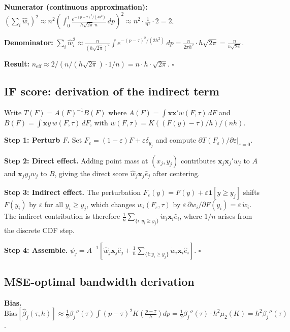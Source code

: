 \documentclass[12pt,a4paper]{article}
\theoremstyle{definition}
\newcommand{\bx}{\mathbf{x}}
\newcommand{\hw}{\hat{w}}
\begin{document}
\textbf{Numerator (continuous approximation):}
$(\sum_i\hw_i)^2 \approx n^2\left(\int_0^1
\frac{e^{-(p-\tau)^2/(4h^2)}}{h\sqrt{2\pi}\,n}\,dp\right)^2
\approx n^2 \cdot \frac{1}{n^2}\cdot 2 = 2$.

\textbf{Denominator:}
$\sum_i\hw_i^2 \approx \frac{n}{(h\sqrt{2\pi})^2}
\int e^{-(p-\tau)^2/(2h^2)}\,dp =
\frac{n}{2\pi h^2}\cdot h\sqrt{2\pi} = \frac{n}{h\sqrt{2\pi}}$.

\textbf{Result:} $n_{\mathrm{eff}} \approx 2\big/(n/(h\sqrt{2\pi})\cdot
1/n) = n\cdot h\cdot\sqrt{2\pi}$. $\square$

\subsection{IF score: derivation of the indirect term}
\label{app:deriv_psi}

Write $T(F) = A(F)^{-1}B(F)$ where
$A(F)=\int\bx\bx' w(F,\tau)\,dF$ and
$B(F)=\int\bx y\,w(F,\tau)\,dF$,
with $w(F,\tau)=K((F(y)-\tau)/h)/(nh)$.

\textbf{Step 1: Perturb $F$.}
Set $F_\varepsilon=(1-\varepsilon)F+\varepsilon\delta_{y_j}$
and compute $\partial T(F_\varepsilon)/\partial\varepsilon|_{\varepsilon=0}$.

\textbf{Step 2: Direct effect.}
Adding point mass at $(x_j,y_j)$ contributes
$\bx_j\bx_j'w_j$ to $A$ and $\bx_j y_j w_j$ to $B$, giving the
direct score $\hat{w}_j\bx_j\hat{e}_j$ after centering.

\textbf{Step 3: Indirect effect.}
The perturbation $F_\varepsilon(y) = F(y)+\varepsilon\mathbf{1}[y\geq y_j]$
shifts $F(y_i)$ by $\varepsilon$ for all $y_i\geq y_j$, which changes
$w_i(F_\varepsilon,\tau)$ by
$\varepsilon\,\partial w_i/\partial F(y_i) = \varepsilon\,\dot{w}_i$.
The indirect contribution is therefore
$\frac{1}{n}\sum_{\{i:y_i\geq y_j\}}\dot{w}_i\bx_i\hat{e}_i$,
where $1/n$ arises from the discrete CDF step.

\textbf{Step 4: Assemble.}
$\psi_j = A^{-1}\left[\hw_j\bx_j\hat{e}_j +
\frac{1}{n}\sum_{\{i:y_i\geq y_j\}}\dot{w}_i\bx_i\hat{e}_i\right]$.
$\square$

\subsection{MSE-optimal bandwidth derivation}
\label{app:deriv_hstar}

\textbf{Bias.}
$\mathrm{Bias}[\hat\beta_j(\tau,h)] \approx
\frac{1}{2}\beta_j''(\tau)\int(p-\tau)^2 K\!\left(\frac{p-\tau}{h}\right)dp
= \frac{1}{2}\beta_j''(\tau)\cdot h^2\mu_2(K) = h^2\beta_j''(\tau)$.
\end{document}
